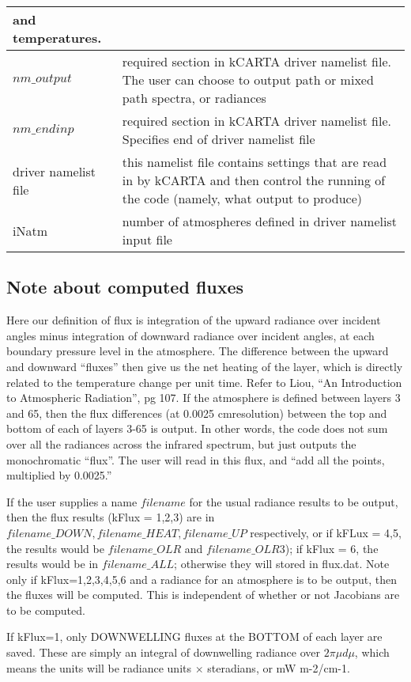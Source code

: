 \documentclass[12pt]{article}
\newcommand{\kc}{\textsf{kCARTA}\xspace}
\newcommand{\cm}{\hbox{cm}}
\newlength{\colwidth}
\begin{document}
\begin{longtable}{|l|p{\colwidth}|}
                and temperatures.\\ \hline
$nm\_output$ & required section in \kc driver namelist file.  The user can 
            choose to output path or mixed path spectra, or radiances\\ \hline
$nm\_endinp$ & required section in \kc driver namelist file.  Specifies end of 
         driver namelist file\\
\hline
driver namelist file & this namelist file contains settings that are read in 
            by  \kc  and then control the running of the code 
            (namely, what output to produce)\\ \hline
iNatm     & number of atmospheres defined in driver namelist input file\\ 
            \hline
\end{longtable}

\subsection{Note about computed fluxes}
Here our definition of flux is integration of the upward radiance over 
incident angles minus integration of downward radiance over incident angles,
at each boundary pressure level in the atmosphere. The difference between the
upward and downward ``fluxes'' then give us the net heating of the layer, 
which is directly related to the temperature change per unit time.  Refer to 
Liou,  ``An Introduction to Atmospheric Radiation'', pg 107. If the 
atmosphere is defined between layers 3 and 65, then the flux differences 
(at 0.0025 \cm resolution) between the top and bottom of each of layers 
3-65 is output. In other words, the code does not sum over all the radiances 
across the infrared spectrum, but just outputs the monochromatic ``flux''. The
user will read in this flux, and ``add all the points, multiplied by 0.0025.''

If the user supplies a name $filename$ for the usual radiance 
results to be output, then the flux results (kFlux = 1,2,3) are in 
$filename\_DOWN, filename\_HEAT, filename\_UP$ respectively, 
or if kFLux = 4,5, the results would be $filename\_OLR$ and $filename\_OLR3$); 
if kFlux = 6, the results would be in $filename\_ALL$; 
otherwise they will stored in flux.dat. Note only if kFlux=1,2,3,4,5,6 and a radiance for
an atmosphere is to be output, then the fluxes will be computed. This is 
independent of whether or not Jacobians are to be computed. 

If kFlux=1, only DOWNWELLING fluxes at the BOTTOM of each layer are saved. These
are simply an integral of downwelling radiance over $2 \pi \mu d\mu$, which means the units will 
be radiance units $\times$ steradians, or mW m-2/cm-1. 
\end{document}
